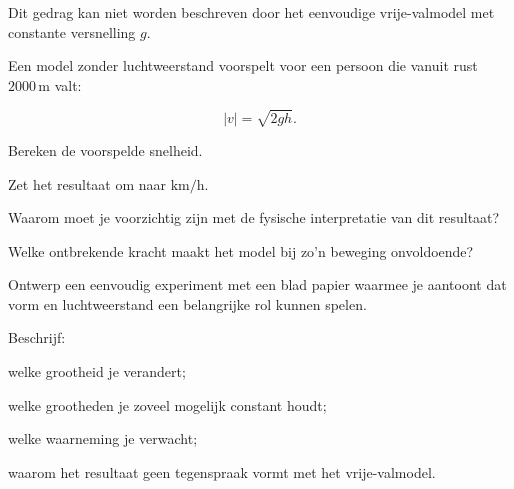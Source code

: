\documentclass{ximera}
\begin{document}
Dit gedrag kan niet worden beschreven door het eenvoudige
vrije-valmodel met constante versnelling $g$.


\begin{oefening}{\oefU\ESS}

Een model zonder luchtweerstand voorspelt voor een persoon die vanuit
rust $2000\,\mathrm{m}$ valt:

\[
|v|=\sqrt{2gh}.
\]

\begin{question}
Bereken de voorspelde snelheid.
\end{question}

\begin{question}
Zet het resultaat om naar $\mathrm{km/h}$.
\end{question}

\begin{question}
Waarom moet je voorzichtig zijn met de fysische interpretatie van
dit resultaat?
\end{question}

\begin{question}
Welke ontbrekende kracht maakt het model bij zo'n beweging
onvoldoende?
\end{question}

\end{oefening}


\begin{oefening}{\oefG}

Ontwerp een eenvoudig experiment met een blad papier waarmee je
aantoont dat vorm en luchtweerstand een belangrijke rol kunnen spelen.

Beschrijf:

\begin{question}
welke grootheid je verandert;
\end{question}

\begin{question}
welke grootheden je zoveel mogelijk constant houdt;
\end{question}

\begin{question}
welke waarneming je verwacht;
\end{question}

\begin{question}
waarom het resultaat geen tegenspraak vormt met het vrije-valmodel.
\end{question}

\end{oefening}
\end{document}
